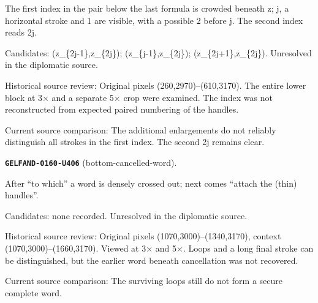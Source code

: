 The first index in the pair below the last formula is crowded beneath z; j, a horizontal stroke and 1 are visible, with a possible 2 before j. The second index reads 2j.\par
Candidates: (z\_\{2j-1\},z\_\{2j\}); (z\_\{j-1\},z\_\{2j\}); (z\_\{2j+1\},z\_\{2j\}). Unresolved in the diplomatic source.\par
Historical source review: Original pixels (260,2970)–(610,3170). The entire lower block at 3× and a separate 5× crop were examined. The index was not reconstructed from expected paired numbering of the handles.\par
Current source comparison: The additional enlargements do not reliably distinguish all strokes in the first index. The second 2j remains clear.\par\medskip
\par\noindent\leavevmode{}\label{GELFAND-0160-U406}\label{GELFAND-P001480:bottom-cancelled-word}\textbf{\texttt{GELFAND-0160-U406}} (bottom-cancelled-word).\nopagebreak[4]\par
After “to which” a word is densely crossed out; next comes “attach the (thin) handles”.\par
Candidates: none recorded. Unresolved in the diplomatic source.\par
Historical source review: Original pixels (1070,3000)–(1340,3170), context (1070,3000)–(1660,3170). Viewed at 3× and 5×. Loops and a long final stroke can be distinguished, but the earlier word beneath cancellation was not recovered.\par
Current source comparison: The surviving loops still do not form a secure complete word.\par\medskip
